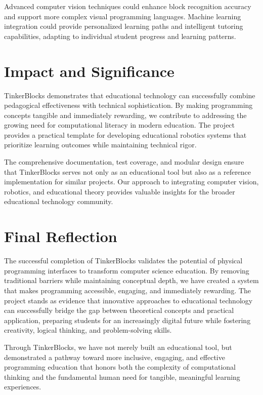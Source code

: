 Advanced computer vision techniques could enhance block recognition accuracy and support more complex visual programming languages. Machine learning integration could provide personalized learning paths and intelligent tutoring capabilities, adapting to individual student progress and learning patterns.

\section{Impact and Significance}

TinkerBlocks demonstrates that educational technology can successfully combine pedagogical effectiveness with technical sophistication. By making programming concepts tangible and immediately rewarding, we contribute to addressing the growing need for computational literacy in modern education. The project provides a practical template for developing educational robotics systems that prioritize learning outcomes while maintaining technical rigor.

The comprehensive documentation, test coverage, and modular design ensure that TinkerBlocks serves not only as an educational tool but also as a reference implementation for similar projects. Our approach to integrating computer vision, robotics, and educational theory provides valuable insights for the broader educational technology community.

\section{Final Reflection}

The successful completion of TinkerBlocks validates the potential of physical programming interfaces to transform computer science education. By removing traditional barriers while maintaining conceptual depth, we have created a system that makes programming accessible, engaging, and immediately rewarding. The project stands as evidence that innovative approaches to educational technology can successfully bridge the gap between theoretical concepts and practical application, preparing students for an increasingly digital future while fostering creativity, logical thinking, and problem-solving skills.

Through TinkerBlocks, we have not merely built an educational tool, but demonstrated a pathway toward more inclusive, engaging, and effective programming education that honors both the complexity of computational thinking and the fundamental human need for tangible, meaningful learning experiences.